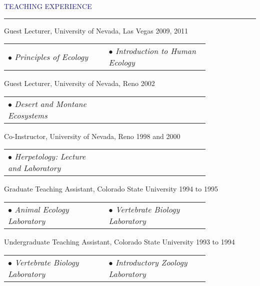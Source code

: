 \documentclass{resume} %
\renewenvironment{rSection}[1]{
\sectionskip
\textcolor{MidnightBlue}{\MakeUppercase{#1}}
\sectionlineskip
\hrule
\begin{list}{}{
\setlength{\leftmargin}{1.5em}
}
\item[]
}{
\end{list}
}
\begin{document}
\begin{rSection}{Teaching Experience}
Guest Lecturer, University of Nevada, Las Vegas \hfill 2009, 2011
\begin{center}
\begin{tabular}{p{0.4\linewidth}p{0.4\linewidth}}
		$\bullet$ 	\textit{Principles of Ecology} &
    $\bullet$ 	\textit{Introduction to Human Ecology} \\
\end{tabular}
\end{center}

Guest Lecturer, University of Nevada, Reno \hfill 2002
\begin{center}
\begin{tabular}{p{0.4\linewidth}p{0.4\linewidth}}
   $\bullet$  \textit{Desert and Montane Ecosystems} & \\
\end{tabular}
\end{center}

Co-Instructor, University of Nevada, Reno \hfill 1998 and 2000
\begin{center}
\begin{tabular}{p{0.4\linewidth}p{0.4\linewidth}}
		$\bullet$ 	\textit{Herpetology: Lecture and Laboratory} &
\end{tabular}
\end{center}

Graduate Teaching Assistant, Colorado State University \hfill 1994 to 1995
\begin{center}
\begin{tabular}{p{0.4\linewidth}p{0.4\linewidth}}
	   $\bullet$ 	\textit{Animal Ecology Laboratory} & 
     $\bullet$ 	\textit{Vertebrate Biology Laboratory} \\
\end{tabular}
\end{center}

Undergraduate Teaching Assistant, Colorado State University \hfill 1993 to 1994
\begin{center}
\begin{tabular}{p{0.4\linewidth}p{0.4\linewidth}}
	   $\bullet$ \textit{Vertebrate Biology Laboratory} & 
     $\bullet$ \textit{Introductory Zoology Laboratory} \\
\end{tabular}
\end{center}

\end{rSection}
\end{document}
